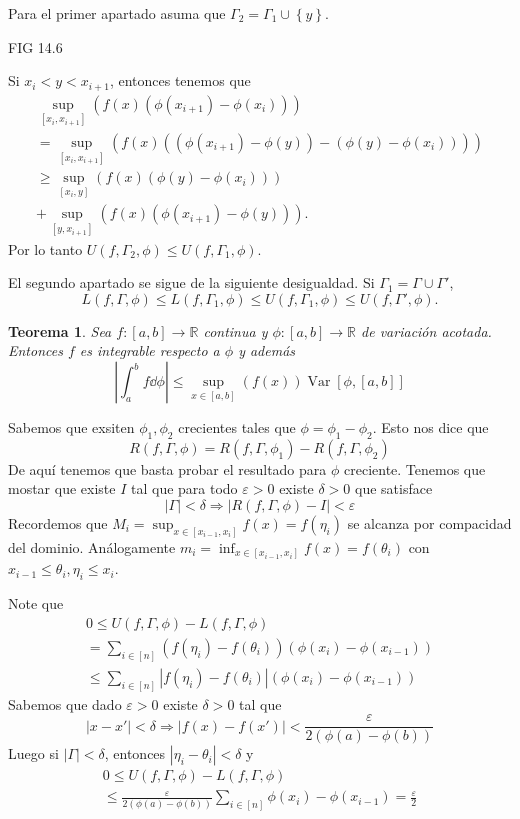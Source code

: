 \documentclass[12pt]{article}
\theoremstyle{plain}
\newtheorem{Th}{Teorema}[subsection]   %
\theoremstyle{definition}
\theoremstyle{remark}
\numberwithin{equation}{section}
\DeclareMathOperator{\Var}{Var}     %
\newcommand{\bR}{\mathbb{R}}        %
\renewcommand{\geq}{\geqslant}      %
\renewcommand{\leq}{\leqslant}      %
\renewcommand{\:}{\colon}           %
\newcommand{\conj}[1]{\left\lbrace#1\right\rbrace}
\newcommand{\bonj}[1]{\left\lbrack#1\right\rbrack}
\begin{document}
\begin{multicols}{2}
\begin{ptcbp}
Para el primer apartado asuma que $\Gamma_2=\Gamma_1\cup\conj{y}$.\par
FIG 14.6\par
Si $x_i<y<x_{i+1}$, entonces tenemos que
\begin{gather*}
  \sup_{\bonj{x_i,x_{i+1}}}(f(x)(\phi(x_{i+1})-\phi(x_i))) \\
  = \sup_{\bonj{x_i,x_{i+1}}}(f(x)((\phi(x_{i+1})-\phi(y))-(\phi(y)-\phi(x_i)))) \\
  \geq  \sup_{\bonj{x_i,y}}(f(x)(\phi(y)-\phi(x_i)))\\
  + \sup_{\bonj{y,x_{i+1}}}(f(x)(\phi(x_{i+1})-\phi(y))).
\end{gather*}
Por lo tanto $U(f,\Gamma_2,\phi)\leq U(f,\Gamma_1,\phi)$.\par
 El segundo apartado se sigue de la siguiente desigualdad. Si $\Gamma_1=\Gamma\cup\Gamma'$,
$$L(f,\Gamma,\phi)\leq L(f,\Gamma_1,\phi)\leq U(f,\Gamma_1,\phi)\leq U(f,\Gamma',\phi).$$
\end{ptcbp}

\begin{Th}\label{thm:primerCriterioRiemannS}
  Sea $f\:\bonj{a,b}\to\bR$ continua y $\phi\:\bonj{a,b}\to\bR$ de variación acotada. Entonces $f$ es integrable respecto a $\phi$ y además
  $$\left|\int_{a}^{b}f\dd\phi\right|\leq\sup_{x\in\bonj{a,b}}(f(x))\Var\bonj{\phi,\bonj{a,b}}$$
\end{Th}

\begin{ptcbp}
Sabemos que exsiten $\phi_1,\phi_2$ crecientes tales que $\phi=\phi_1-\phi_2$. Esto nos dice que
$$R(f,\Gamma,\phi)=R(f,\Gamma,\phi_1)-R(f,\Gamma,\phi_2)$$
De aquí tenemos que basta probar el resultado para $\phi$ creciente. Tenemos que mostar que existe $I$ tal que para todo $\varepsilon>0$ existe $\delta>0$ que satisface
$$|\Gamma|<\delta\Rightarrow|R(f,\Gamma,\phi)-I|<\varepsilon$$
Recordemos que $M_i=\sup_{x\in\bonj{x_{i-1},x_i}}f(x)=f(\eta_i)$ se alcanza por compacidad del dominio. Análogamente $m_i=\inf_{x\in\bonj{x_{i-1},x_i}}f(x)=f(\theta_i)$ con $x_{i-1}\leq \theta_i,\eta_i\leq x_i$.\par
Note que
\begin{gather*}
 0\leq  U(f,\Gamma,\phi)-L(f,\Gamma,\phi)\\
  =\sum_{i\in\bonj{n}}(f(\eta_i)-f(\theta_i))(\phi(x_i)-\phi(x_{i-1}))\\
  \leq\sum_{i\in\bonj{n}}|f(\eta_i)-f(\theta_i)|(\phi(x_i)-\phi(x_{i-1}))
\end{gather*}
Sabemos que dado $\varepsilon>0$ existe $\delta>0$ tal que
$$|x-x'|<\delta\Rightarrow|f(x)-f(x')|<\frac{\varepsilon}{2(\phi(a)-\phi(b))}$$
Luego si $|\Gamma|<\delta$, entonces $|\eta_i-\theta_i|<\delta$ y
\begin{gather*}
   0\leq  U(f,\Gamma,\phi)-L(f,\Gamma,\phi)\\
   \leq \frac{\varepsilon}{2(\phi(a)-\phi(b))}\sum_{i\in\bonj{n}}\phi(x_i)-\phi(x_{i-1})=\frac{\varepsilon}{2}
\end{gather*}
\end{ptcbp}


\end{multicols}
\end{document}
